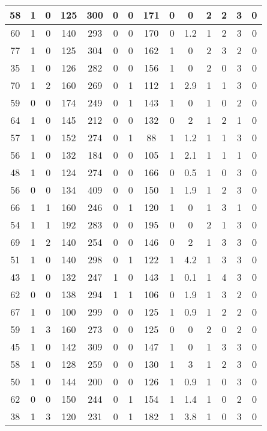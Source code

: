 \documentclass{article}
\begin{document}
\begin{longtable}{|c|c|c|c|c|c|c|c|c|c|c|c|c|c|}
\hline
58 & 1 & 0 & 125 & 300 & 0 & 0 & 171 & 0 & 0 & 2 & 2 & 3 & 0\\
\hline
60 & 1 & 0 & 140 & 293 & 0 & 0 & 170 & 0 & 1.2 & 1 & 2 & 3 & 0\\
\hline
77 & 1 & 0 & 125 & 304 & 0 & 0 & 162 & 1 & 0 & 2 & 3 & 2 & 0\\
\hline
35 & 1 & 0 & 126 & 282 & 0 & 0 & 156 & 1 & 0 & 2 & 0 & 3 & 0\\
\hline
70 & 1 & 2 & 160 & 269 & 0 & 1 & 112 & 1 & 2.9 & 1 & 1 & 3 & 0\\
\hline
59 & 0 & 0 & 174 & 249 & 0 & 1 & 143 & 1 & 0 & 1 & 0 & 2 & 0\\
\hline
64 & 1 & 0 & 145 & 212 & 0 & 0 & 132 & 0 & 2 & 1 & 2 & 1 & 0\\
\hline
57 & 1 & 0 & 152 & 274 & 0 & 1 & 88 & 1 & 1.2 & 1 & 1 & 3 & 0\\
\hline
56 & 1 & 0 & 132 & 184 & 0 & 0 & 105 & 1 & 2.1 & 1 & 1 & 1 & 0\\
\hline
48 & 1 & 0 & 124 & 274 & 0 & 0 & 166 & 0 & 0.5 & 1 & 0 & 3 & 0\\
\hline
56 & 0 & 0 & 134 & 409 & 0 & 0 & 150 & 1 & 1.9 & 1 & 2 & 3 & 0\\
\hline
66 & 1 & 1 & 160 & 246 & 0 & 1 & 120 & 1 & 0 & 1 & 3 & 1 & 0\\
\hline
54 & 1 & 1 & 192 & 283 & 0 & 0 & 195 & 0 & 0 & 2 & 1 & 3 & 0\\
\hline
69 & 1 & 2 & 140 & 254 & 0 & 0 & 146 & 0 & 2 & 1 & 3 & 3 & 0\\
\hline
51 & 1 & 0 & 140 & 298 & 0 & 1 & 122 & 1 & 4.2 & 1 & 3 & 3 & 0\\
\hline
43 & 1 & 0 & 132 & 247 & 1 & 0 & 143 & 1 & 0.1 & 1 & 4 & 3 & 0\\
\hline
62 & 0 & 0 & 138 & 294 & 1 & 1 & 106 & 0 & 1.9 & 1 & 3 & 2 & 0\\
\hline
67 & 1 & 0 & 100 & 299 & 0 & 0 & 125 & 1 & 0.9 & 1 & 2 & 2 & 0\\
\hline
59 & 1 & 3 & 160 & 273 & 0 & 0 & 125 & 0 & 0 & 2 & 0 & 2 & 0\\
\hline
45 & 1 & 0 & 142 & 309 & 0 & 0 & 147 & 1 & 0 & 1 & 3 & 3 & 0\\
\hline
58 & 1 & 0 & 128 & 259 & 0 & 0 & 130 & 1 & 3 & 1 & 2 & 3 & 0\\
\hline
50 & 1 & 0 & 144 & 200 & 0 & 0 & 126 & 1 & 0.9 & 1 & 0 & 3 & 0\\
\hline
62 & 0 & 0 & 150 & 244 & 0 & 1 & 154 & 1 & 1.4 & 1 & 0 & 2 & 0\\
\hline
38 & 1 & 3 & 120 & 231 & 0 & 1 & 182 & 1 & 3.8 & 1 & 0 & 3 & 0\\

\end{longtable}
\end{document}
